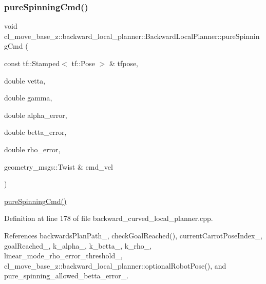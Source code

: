 \mbox{\label{classcl__move__base__z_1_1backward__local__planner_1_1BackwardLocalPlanner_aaa88a0a47e7cfd449c59518577599928}} 
\subsubsection{\texorpdfstring{pure\+Spinning\+Cmd()}{pureSpinningCmd()}}
{\footnotesize\ttfamily void cl\+\_\+move\+\_\+base\+\_\+z\+::backward\+\_\+local\+\_\+planner\+::\+Backward\+Local\+Planner\+::pure\+Spinning\+Cmd (\begin{DoxyParamCaption}\item[{const tf\+::\+Stamped$<$ tf\+::\+Pose $>$ \&}]{tfpose,  }\item[{double}]{vetta,  }\item[{double}]{gamma,  }\item[{double}]{alpha\+\_\+error,  }\item[{double}]{betta\+\_\+error,  }\item[{double}]{rho\+\_\+error,  }\item[{geometry\+\_\+msgs\+::\+Twist \&}]{cmd\+\_\+vel }\end{DoxyParamCaption})\hspace{0.3cm}{\ttfamily [private]}}

\hyperlink{classcl__move__base__z_1_1backward__local__planner_1_1BackwardLocalPlanner_aaa88a0a47e7cfd449c59518577599928}{pure\+Spinning\+Cmd()} 

Definition at line 178 of file backward\+\_\+curved\+\_\+local\+\_\+planner.\+cpp.



References backwards\+Plan\+Path\+\_\+, check\+Goal\+Reached(), current\+Carrot\+Pose\+Index\+\_\+, goal\+Reached\+\_\+, k\+\_\+alpha\+\_\+, k\+\_\+betta\+\_\+, k\+\_\+rho\+\_\+, linear\+\_\+mode\+\_\+rho\+\_\+error\+\_\+threshold\+\_\+, cl\+\_\+move\+\_\+base\+\_\+z\+::backward\+\_\+local\+\_\+planner\+::optional\+Robot\+Pose(), and pure\+\_\+spinning\+\_\+allowed\+\_\+betta\+\_\+error\+\_\+.



